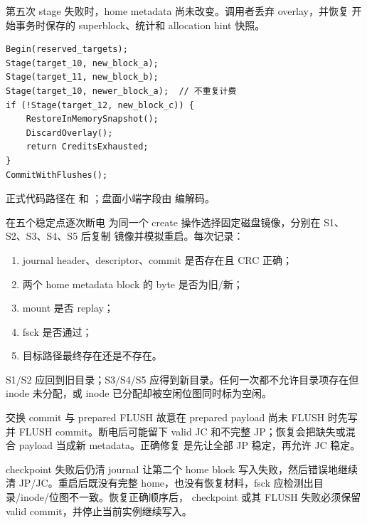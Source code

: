 第五次 stage 失败时，home metadata 尚未改变。调用者丢弃 overlay，并恢复
开始事务时保存的 superblock、统计和 allocation hint 快照。

\begin{lstlisting}
Begin(reserved_targets);
Stage(target_10, new_block_a);
Stage(target_11, new_block_b);
Stage(target_10, newer_block_a);  // 不重复计费
if (!Stage(target_12, new_block_c)) {
    RestoreInMemorySnapshot();
    DiscardOverlay();
    return CreditsExhausted;
}
CommitWithFlushes();
\end{lstlisting}

正式代码路径在  和
；盘面小端字段由
 编解码。

\begin{experimentbox}{在五个稳定点逐次断电}
为同一个 create 操作选择固定磁盘镜像，分别在 S1、S2、S3、S4、S5 后复制
镜像并模拟重启。每次记录：

\begin{enumerate}[leftmargin=2.2em]
  \item journal header、descriptor、commit 是否存在且 CRC 正确；
  \item 两个 home metadata block 的 byte 是否为旧/新；
  \item mount 是否 replay；
  \item fsck 是否通过；
  \item 目标路径最终存在还是不存在。
\end{enumerate}

S1/S2 应回到旧目录；S3/S4/S5 应得到新目录。任何一次都不允许目录项存在但
inode 未分配，或 inode 已分配却被空闲位图同时标为空闲。
\end{experimentbox}

\begin{faultinjectionbox}{交换 commit 与 prepared FLUSH}
故意在 prepared payload 尚未 FLUSH 时先写并 FLUSH commit。断电后可能留下
valid JC 和不完整 JP；恢复会把缺失或混合 payload 当成新 metadata。正确修复
是先让全部 JP 稳定，再允许 JC 稳定。
\end{faultinjectionbox}

\begin{faultinjectionbox}{checkpoint 失败后仍清 journal}
让第二个 home block 写入失败，然后错误地继续清 JP/JC。重启后既没有完整
home，也没有恢复材料，fsck 应检测出目录/inode/位图不一致。恢复正确顺序后，
checkpoint 或其 FLUSH 失败必须保留 valid commit，并停止当前实例继续写入。
\end{faultinjectionbox}

